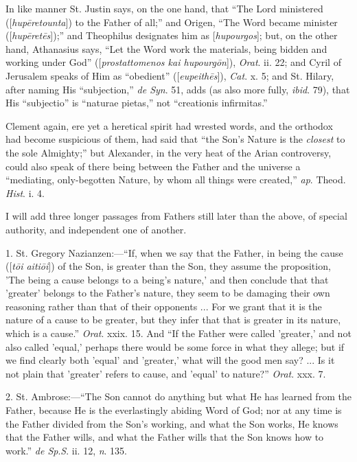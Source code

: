 In like manner St. Justin says, on the one hand, that ``The
Lord ministered ([\emph{hup\={e}retounta}]) to the Father of
all;'' and Origen, ``The Word became minister ([\emph{hup\={e}ret\={e}s}]);''
and Theophilus designates him as [\emph{hupourgos}]; but, on the other
hand, Athanasius says, ``Let the Word work the materials, being bidden and working under God'' ([\emph{prostattomenos kai
hupourg\={o}n}]), \emph{Orat}. ii. 22; and Cyril of Jerusalem
speaks of Him as ``obedient'' ([\emph{eupeith\={e}s}]), \emph{Cat}.
x. 5; and St. Hilary, after naming His ``subjection,'' \emph{de
Syn}. 51, adds (as also more fully, \emph{ibid}. 79), that His
``subjectio'' is ``naturae pietas,'' not ``creationis
infirmitas.''

Clement again, ere yet a heretical spirit had wrested words, and
the orthodox had become suspicious of them, had said that ``the
Son's Nature is the \emph{closest} to the sole Almighty;'' but
Alexander, in the very heat of the Arian controversy, could also speak
of there being between the Father and the universe a ``mediating,
only-begotten Nature, by whom all things were created,'' \emph{ap}.
Theod. \emph{Hist}. i. 4.

I will add three longer passages from Fathers still later than the
above, of special authority, and independent one of another.

1. St. Gregory Nazianzen:—``If, when we say that the Father,
in being the cause ([\emph{t\={o}i aiti\={o}i}]) of the Son, is
greater than the Son, they assume the proposition, 'The being a cause
belongs to a being's nature,' and then conclude that that 'greater'
belongs to the Father's nature, they seem to be damaging their own
reasoning rather than that of their opponents ... For we grant that it
is the nature of a cause to be greater, but they infer that that is
greater in its nature, which is a cause.'' \emph{Orat}. xxix. 15.
And ``If the Father were called 'greater,' and not also called
'equal,' perhaps there would be some force in what they allege; but if
we find clearly both 'equal' and 'greater,' what will the good men
say? ... Is it not plain that 'greater' refers to cause, and
'equal' to nature?'' \emph{Orat}. xxx. 7.

2. St. Ambrose:—``The Son cannot do anything but what He has
learned from the Father, because He is the everlastingly abiding Word
of God; nor at any time is the Father divided from the Son's working,
and what the Son works, He knows that the Father wills, and what the
Father wills that the Son knows how to work.'' \emph{de Sp}.\emph{S}.
ii. 12, \emph{n}. 135.

